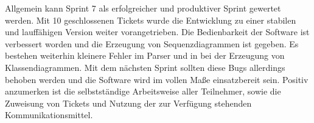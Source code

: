 Allgemein kann Sprint 7 als erfolgreicher und produktiver Sprint gewertet werden. Mit 10 geschlossenen Tickets wurde die Entwicklung zu einer stabilen und lauffähigen Version weiter vorangetrieben. Die Bedienbarkeit der Software ist verbessert worden und die Erzeugung von Sequenzdiagrammen ist gegeben. Es bestehen weiterhin kleinere Fehler im Parser und in bei der Erzeugung von Klassendiagrammen. Mit dem nächsten Sprint sollten diese Bugs allerdings behoben werden und die Software wird im vollen Maße einsatzbereit sein.
Positiv anzumerken ist die selbstständige Arbeitsweise aller Teilnehmer, sowie die Zuweisung von Tickets und Nutzung der zur Verfügung stehenden Kommunikationsmittel.
\nsecend%